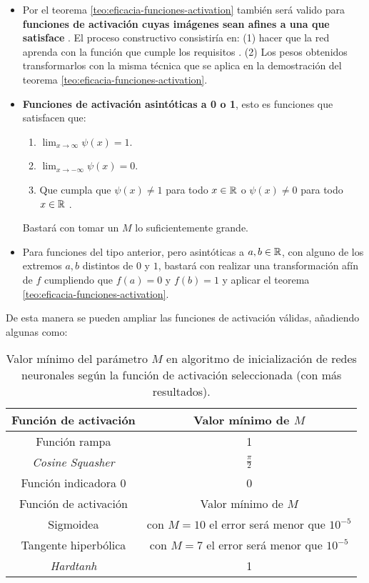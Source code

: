 \begin{itemize}
    \item Por el teorema \ref{teo:eficacia-funciones-activation} también será valido para 
    \textbf{funciones de activación cuyas imágenes sean
     afines a una que satisface }. 
     El proceso constructivo consistiría en: 
     (1) hacer que la red aprenda con la función que cumple los requisitos .
      (2) Los pesos obtenidos transformarlos con la misma técnica 
      que se aplica en la demostración del teorema \ref{teo:eficacia-funciones-activation}. 
    
    \item  \textbf{Funciones de activación asintóticas a 0 o 1}, esto es funciones que satisfacen que: 
    \begin{enumerate}
        \item $\lim _{x \rightarrow \infty} \psi(x) = 1
        $.
        \item $\lim _{x \rightarrow -\infty} \psi(x) = 0$.
        \item Que cumpla que $\psi(x) \neq 1$ para todo  $x\in \mathbb{R}$  o $\psi(x) \neq 0$ para todo $x\in \mathbb{R}$ .
    \end{enumerate}
    Bastará con tomar un $M$ lo suficientemente grande. 
    \item Para funciones del tipo anterior, pero asintóticas a $a,b \in \mathbb{R}$, con alguno de los extremos $a,b$ distintos de $0$ y $1$, bastará con realizar una transformación afín de $f$ cumpliendo que $f(a)= 0$ y $f(b)= 1$ y aplicar el teorema \ref{teo:eficacia-funciones-activation}. 
\end{itemize}

De esta manera se pueden ampliar las funciones de activación válidas, añadiendo algunas como: 

\begin{table}[H]
    \centering
    \begin{tabular}{|c|c|}
    \hline
        \textbf{Función de activación}  & \textbf{Valor mínimo de $M$} \\ \hline
        Función rampa & 1 \\ \hline
        \textit{Cosine Squasher} & $\frac{\pi}{2}$ \\ \hline
        Función indicadora 0 & 0 \\ \hline
        Función de activación  & Valor mínimo de $M$ \\ \hline
        Sigmoidea  & con $M=10$ el error será menor que $10^{-5}$\\ \hline
        Tangente hiperbólica  &  con $M=7$ el error será menor que $10^{-5}$\\ \hline
        \textit{Hardtanh} & 1 \\ \hline
    \end{tabular}
    \caption{Valor mínimo del parámetro $M$ en algoritmo de inicialización de redes neuronales según la función de activación seleccionada (con más resultados).}
    \label{table:M-activation-function-2}
\end{table}
